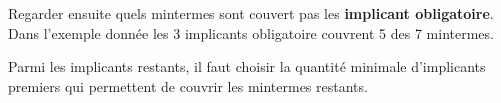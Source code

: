 \documentclass{report}
\begin{document}
\begin{multicols*}{3}
    \begin{center}
    \end{center}
    \noindent 
    Regarder ensuite quels mintermes sont couvert pas les 
    \textbf{implicant obligatoire}. Dans l'exemple donnée les 3 implicants obligatoire 
    couvrent 5 des 7 mintermes. 

    Parmi les implicants restants, il faut choisir la quantité minimale d'implicants 
    premiers qui permettent de couvrir les mintermes restants. 



    \begin{center}
    \end{center}


\end{multicols*}
\end{document}
